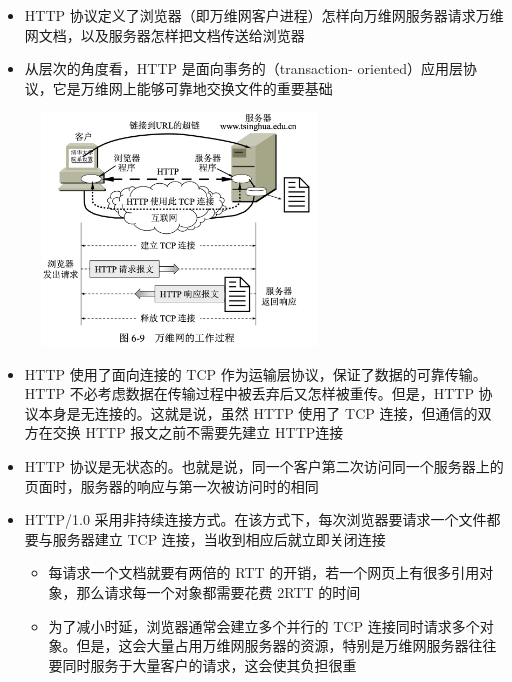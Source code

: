 \documentclass[cs4size,a4paper,10pt]{ctexart}
\begin{document}
	\begin{itemize}
		\item HTTP 协议定义了浏览器（即万维网客户进程）怎样向万维网服务器请求万维网文档，以及服务器怎样把文档传送给浏览器
		\item 从层次的角度看，HTTP 是面向事务的（transaction- oriented）应用层协议，它是万维网上能够可靠地交换文件的重要基础
	\end{itemize}

	\begin{figure}[H]
		\centering
		\includegraphics[width=0.65\textwidth]{img/6.9}
	\end{figure}

	\begin{itemize}
		\item HTTP 使用了面向连接的 TCP 作为运输层协议，保证了数据的可靠传输。HTTP 不必考虑数据在传输过程中被丢弃后又怎样被重传。但是，HTTP 协议本身是无连接的。这就是说，虽然 HTTP 使用了 TCP 连接，但通信的双方在交换 HTTP 报文之前不需要先建立 HTTP连接
		\item HTTP 协议是无状态的。也就是说，同一个客户第二次访问同一个服务器上的页面时，服务器的响应与第一次被访问时的相同
		\item HTTP/1.0 采用非持续连接方式。在该方式下，每次浏览器要请求一个文件都要与服务器建立 TCP 连接，当收到相应后就立即关闭连接
		\begin{itemize}
			\item 每请求一个文档就要有两倍的 RTT 的开销，若一个网页上有很多引用对象，那么请求每一个对象都需要花费 2RTT 的时间
			\item 为了减小时延，浏览器通常会建立多个并行的 TCP 连接同时请求多个对象。但是，这会大量占用万维网服务器的资源，特别是万维网服务器往往要同时服务于大量客户的请求，这会使其负担很重
		\end{itemize}
	\end{itemize}
\end{document}
